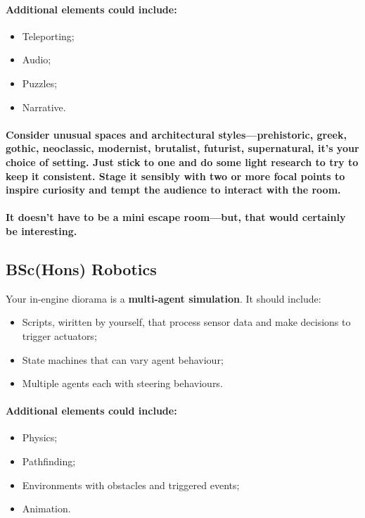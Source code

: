 \documentclass{../../fal_assignment}
\begin{document}
\paragraph{Additional elements could include:}
\begin{itemize}
\item Teleporting;
\item Audio;
\item Puzzles; 
\item Narrative.
\end{itemize}
\paragraph{Consider unusual spaces and architectural styles---prehistoric, greek, gothic, neoclassic, modernist, brutalist, futurist, supernatural, it's your choice of setting. Just stick to one and do some light research to try to keep it consistent. Stage it sensibly with two or more focal points to inspire curiosity and tempt the audience to interact with the room.}

\paragraph{It doesn't have to be a mini escape room---but, that would certainly be interesting.}

\subsection*{BSc(Hons) Robotics}

Your in-engine diorama is a \textbf{multi-agent simulation}. It should include:
\begin{itemize}
\item Scripts, wiritten by yourself, that process sensor data and make decisions to trigger actuators;
\item State machines that can vary agent behaviour; 
\item Multiple agents each with steering behaviours.
\end{itemize}
\paragraph{Additional elements could include:}
\begin{itemize}
\item Physics;
\item Pathfinding;
\item Environments with obstacles and triggered events;
\item Animation.
\end{itemize}
\end{document}
